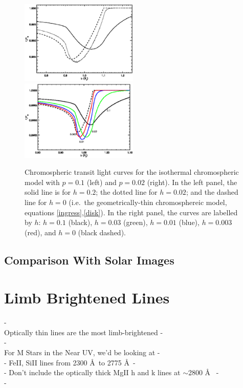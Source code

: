 \documentclass[twocolumn]{emulateapj}
\begin{document}
\begin{figure}

\includegraphics[width=0.5\textwidth]{lc_h.1_p.1.eps}
\includegraphics[width=0.5\textwidth]{plot_3d_p.02.eps}
\caption{Chromospheric transit light curves for the
isothermal chromospheric model with $p=0.1$ (left) and
$p=0.02$ (right).   In the left panel, the
solid line is for $h=0.2$; the dotted line for $h=0.02$;
and the dashed line for $h=0$ (i.e.\ the geometrically-thin
chromosphereic model, equations \ref{ingress},\ref{disk}).
In the right panel, the curves are labelled by $h$:
$h=0.1$ (black), $h=0.03$ (green), $h=0.01$ (blue),
$h=0.003$ (red), and $h=0$ (black dashed).}
\label{fig04}
\end{figure}

\subsection{Comparison With Solar Images}

\section{Limb Brightened Lines}

-\\
Optically thin lines are the most limb-brightened
-\\
-\\
For M Stars in the Near UV, we'd be looking at 
-\\
- FeII, SiII lines from 2300 \AA\  to 2775 \AA\ 
-\\
- Don't include the optically thick MgII h and k lines at
$\sim$2800 \AA\ \citep{2007PASP..119...67H}
-\\
-\\
\end{document}
